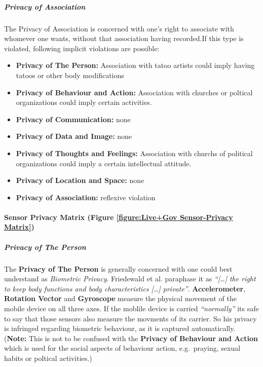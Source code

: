 \subparagraph{Privacy of Association}

The Privacy of Association is concerned with one's right to associate
with whomever one wants, without that association having recorded.If
this type is violated, following implicit violations are possible:

\begin{itemize}
\itemsep1pt\parskip0pt
\item
  \textbf{Privacy of The Person:} Association with tatoo artists could
  imply having tatoos or other body modifications
\item
  \textbf{Privacy of Behaviour and Action:} Association with churches or
  poltical organizations could imply certain activities.
\item
  \textbf{Privacy of Communication:} none
\item
  \textbf{Privacy of Data and Image:} none
\item
  \textbf{Privacy of Thoughts and Feelings:} Association with churchs of
  political organizations could imply a certain intellectual attitude.
\item
  \textbf{Privacy of Location and Space:} none
\item
  \textbf{Privacy of Association:} reflexive violation
\end{itemize}

\paragraph{Sensor Privacy Matrix (Figure \ref{figure:Live+Gov Sensor-Privacy Matrix})}





\subparagraph{Privacy of The Person}

The \textbf{Privacy of The Person} is generally concerned with one could
best understand as \emph{Biometric Privacy}. Friedewald et al. paraphase
it as \emph{``{[}\ldots{}{]} the right to keep body functions and body
characteristics {[}\ldots{}{]} private''}. \textbf{Accelerometer},
\textbf{Rotation Vector} and \textbf{Gyroscope} measure the physical
movement of the mobile device on all three axes. If the moblile device
is carried \emph{``normally''} its safe to say that those sensors also
measure the movments of its carrier. So his privacy is infringed
regarding biometric behaviour, as it is captured automatically.
(\textbf{Note:} This is not to be confused with the \textbf{Privacy of
Behaviour and Action} which is used for the social aspects of behaviour
action, e.g.~praying, sexual habits or poltical activities.)

